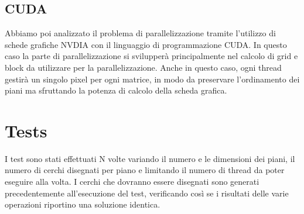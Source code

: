 \documentclass[11pt]{article}
\begin{document}
    \subsection{CUDA}\label{subsec:cuda}
    Abbiamo poi analizzato il problema di parallelizzazione tramite l'utilizzo di schede grafiche NVDIA
    con il linguaggio di programmazione CUDA\@.
    In questo caso la parte di parallelizzazione si svilupperà principalmente nel calcolo di grid e block da utilizzare per
    la parallelizzazione.
    Anche in questo caso, ogni thread gestirà un singolo pixel per ogni matrice, in modo da preservare
    l'ordinamento dei piani ma sfruttando la potenza di calcolo della scheda grafica.
    \clearpage

    \section{Tests}\label{sec:tests}
    I test sono stati effettuati N volte variando il numero e le dimensioni dei piani, il numero di cerchi disegnati
    per piano e limitando il numero di thread da poter eseguire alla volta.
    I cerchi che dovranno essere disegnati sono generati precedentemente all'esecuzione del test, verificando
    così se i risultati delle varie operazioni riportino una soluzione identica.
\end{document}
